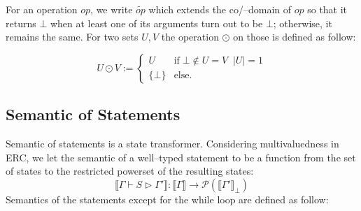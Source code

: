 \documentclass{article}
\newcommand{\sem}[1]{\llbracket #1 \rrbracket }
\begin{document}
For an operation $op$, we write $\tilde{op}$ which extends the co/--domain of $op$ 
so that  it returns $\bot$ when at least one of its arguments turn out to be $\bot$; otherwise,
it remains the same. For two sets $U, V$ the operation $\odot$ on those is defined as follow:

\[
U \odot V := 
\begin{cases}
U &\text{if}\; \bot\not\in U=V\;\;|U|=1\\
\{\bot\} &\text{else.}
\end{cases}
\]

\subsection{Semantic of Statements}
\label{ss:semstatement}
Semantic of statements is a state transformer.
Considering multivaluedness in ERC,
we let the semantic of a well--typed statement to be a function from
the set of states to the restricted powerset of the resulting states:
\[
\sem{\Gamma \vdash S \triangleright \Gamma'} : \sem{\Gamma} \to \mathcal{P}(\sem{\Gamma'}_\bot)
\]
Semantics of the statements except for the while loop are defined as follow:
\end{document}
